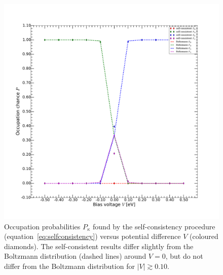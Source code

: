 \begin{figure}[htb]
    \centering
    \includegraphics[width=.95\textwidth]{pdf/selfconsistent_low_temperature_1.pdf}
    \caption{Occupation probabilities $P_\kappa$ found by the self-consistency procedure (equation~\ref{eq:selfconsistency}) versus potential difference $V$ (coloured diamonds). The self-consistent results differ slightly from the Boltzmann distribution (dashed lines) around $V=0$, but do not differ from the Boltzmann distribution for $\left|V\right|\gtrsim 0.10$.}
    \label{fig:occprob}
\end{figure} \clearpage

